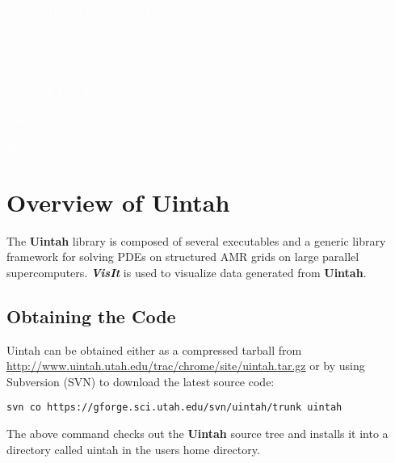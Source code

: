 \documentclass[11pt,fleqn]{book} %
\begin{document}
  \begingroup
    \thispagestyle{empty}
    \AddToShipoutPicture*{\BackgroundPic} %
    \centering
    \vspace*{1cm}
    \par\normalfont\fontsize{35}{35}\sffamily\selectfont
    \textcolor{white}{Vaango/Uintah Installation Guide}\par %
    \vspace*{0.5cm}
    {\Large \textcolor{white}{Vaango version 16.02}}\par
    {\Large \textcolor{white}{February 2016}}\par
    \vspace*{1cm}
    {\Large \textcolor{white}{The Utah Uintah team}}\par %
    {\Large \textcolor{white}{and}}\par %
    {\Large \textcolor{white}{Biswajit Banerjee}}\par %
  \endgroup

  

\chapter{Overview of Uintah} \label{sec:overview} The \textbf{Uintah}
library is composed of several executables and a generic library
framework for solving PDEs on structured AMR grids on large parallel
supercomputers. \textbf{\emph{VisIt}} is used to visualize data
generated from \textbf{Uintah}.

\section{Obtaining the Code}
Uintah can be obtained either as a compressed tarball from
\url{http://www.uintah.utah.edu/trac/chrome/site/uintah.tar.gz} or by
using Subversion (SVN) to download the latest source code:

\begin{lstlisting}
svn co https://gforge.sci.utah.edu/svn/uintah/trunk uintah
\end{lstlisting}

The above command checks out the \textbf{Uintah} source tree and
installs it into a directory called uintah in the users home
directory.
\end{document}
